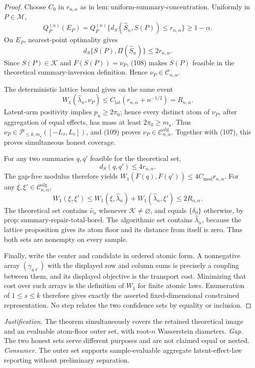\documentclass{article}
\begin{document}
\begin{proof}
Choose \(C_0\) in \(r_{n,\alpha}\) as in \(\mathrm{lem:uniform\text{-}summary\text{-}concentration}\).  Uniformly in \(P\in\mathcal M\),
\[
Q_P^{(n)}(E_P)
=Q_P^{(n)}\{d_S(\widehat S_n,S(P))\le r_{n,\alpha}\}
\ge1-\alpha.                                                        \tag{107}
\]
On \(E_P\), nearest-point optimality gives
\[
d_S\{S(P),\Pi(\widehat S_n)\}\le2r_{n,\alpha}.                      \tag{108}
\]
Since \(S(P)\in\mathcal K\) and \(\overline F(S(P))=\nu_P\), (108) makes \(S(P)\) feasible in the theoretical summary-inversion definition.  Hence \(\nu_P\in\mathcal C_{n,\alpha}\).

The deterministic lattice bound gives on the same event
\[
W_1(\widehat\lambda_n,\nu_P)
\le C_{\mathrm{lat}}(r_{n,\alpha}+n^{-1/2})
=R_{n,\alpha}.                                                       \tag{109}
\]
Latent-arm positivity implies \(p_u\ge2\pi_0\); hence every distinct atom of \(\nu_P\), after aggregation of equal effects, has mass at least \(2\pi_0\ge m_\star\).  Thus \(\nu_P\in\mathcal P_{\le k,m_\star}([-L_{\tau},L_{\tau}])\), and (109) proves \(\nu_P\in\mathcal C^{\mathrm{alg}}_{n,\alpha}\).  Together with (107), this proves simultaneous honest coverage.

For any two summaries \(q,q'\) feasible for the theoretical set,
\[
d_S(q,q')\le4r_{n,\alpha}.
\]
The gap-free modulus therefore yields
\(W_1(\overline F(q),\overline F(q'))\le4C_{\mathrm{mod}}r_{n,\alpha}\).  For any \(\xi,\xi'\in\mathcal C^{\mathrm{alg}}_{n,\alpha}\),
\[
W_1(\xi,\xi')
\le W_1(\xi,\widehat\lambda_n)+W_1(\widehat\lambda_n,\xi')
\le2R_{n,\alpha}.                                                    \tag{110}
\]
The theoretical set contains \(\widehat\nu_n\) whenever \(\mathcal K\ne\varnothing\), and equals \(\{\delta_0\}\) otherwise, by \(\mathrm{prop:summary\text{-}repair\text{-}total\text{-}borel}\).  The algorithmic set contains \(\widehat\lambda_n\), because the lattice proposition gives its atom floor and its distance from itself is zero.  Thus both sets are nonempty on every sample.

Finally, write the center and candidate in ordered atomic form.  A nonnegative array \((\gamma_{a\ell})\) with the displayed row and column sums is precisely a coupling between them, and its displayed objective is the transport cost.  Minimizing that cost over such arrays is the definition of \(W_1\) for finite atomic laws.  Enumeration of \(1\le s\le k\) therefore gives exactly the asserted fixed-dimensional constrained representation.  No step relates the two confidence sets by equality or inclusion.
\end{proof}
\par\smallskip\noindent \textit{Justification.} The theorem simultaneously covers the retained theoretical image and an evaluable atom-floor outer set, with root-\(n\) Wasserstein diameters. \textit{Gap.} The two honest sets serve different purposes and are not claimed equal or nested. \textit{Consumer.} The outer set supports sample-evaluable aggregate latent-effect-law reporting without preliminary separation.
\end{document}
